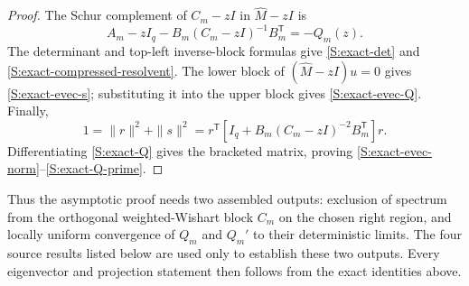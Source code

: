 \begin{proof}
The Schur complement of $C_m-zI$ in $\widehat M-zI$ is
\begin{equation}
A_m-zI_q-B_m(C_m-zI)^{-1}B_m^{\mathsf T}=-Q_m(z).
\end{equation}
The determinant and top-left inverse-block formulas give
\eqref{S:exact-det} and \eqref{S:exact-compressed-resolvent}. The lower block
of $(\widehat M-zI)u=0$ gives \eqref{S:exact-evec-s}; substituting it into the
upper block gives \eqref{S:exact-evec-Q}. Finally,
\begin{equation}
1=\|r\|^2+\|s\|^2
=
r^{\mathsf T}
\left[I_q+B_m(C_m-zI)^{-2}B_m^{\mathsf T}\right]r.
\end{equation}
Differentiating \eqref{S:exact-Q} gives the bracketed matrix, proving
\eqref{S:exact-evec-norm}--\eqref{S:exact-Q-prime}.
\end{proof}

Thus the asymptotic proof needs two assembled outputs: exclusion of spectrum
from the orthogonal weighted-Wishart block $C_m$ on the chosen right region,
and locally uniform convergence of $Q_m$ and $Q_m'$ to their deterministic
limits.  The four source results listed below are used only to establish these
two outputs.  Every eigenvector and projection statement then follows from the
exact identities above.

